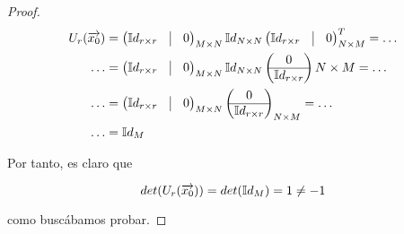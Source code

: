 \begin{proof}
    \begin{equation}
    \begin{split}
        U_r(\nv{x_0}) &= \begin{pmatrix}
            \mathbb{I}d_{r \times r} & \vline & 0 \\
        \end{pmatrix}_{M \times N}
        \mathbb{I}d_{N \times N}
        \begin{pmatrix}
            \mathbb{I}d_{r \times r} & \vline & 0 \\
        \end{pmatrix}^T_{N \times M} = \ldots \\
        \ldots &= \begin{pmatrix}
            \mathbb{I}d_{r \times r} & \vline & 0 \\
        \end{pmatrix}_{M \times N}
        \mathbb{I}d_{N \times N}
        \begin{pmatrix}
            0 \\
            \hline
            \mathbb{I}d_{r \times r}
        \end{pmatrix}{N \times M} = \ldots \\
        \ldots &= \begin{pmatrix}
            \mathbb{I}d_{r \times r} & \vline & 0 \\
        \end{pmatrix}_{M \times N}
        \begin{pmatrix}
            0 \\
            \hline
            \mathbb{I}d_{r \times r}
        \end{pmatrix}_{N \times M} = \ldots \\
        \ldots &= \mathbb{I}d_M
    \end{split}
    \end{equation}

    Por tanto, es claro que

    \begin{equation}
        det(U_r(\overrightarrow{x_0})) = det(\mathbb{I}d_M) = 1 \neq -1
    \end{equation}

    como buscábamos probar.
\end{proof}
